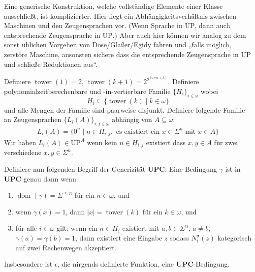 \documentclass[nofonts]{uebung}
\newtheorem{definition}[theorem]{Definition}
\def\UP{\ensuremath{\mathrm{UP}}}
\def\DisjNP{\ensuremath{\mathrm{DisjNP}}}
\DeclareMathOperator{\dom}{dom}
\DeclareMathOperator{\tower}{tower}
\begin{document}
Eine generische Konstruktion, welche vollständige Elemente einer Klasse ausschließt, ist komplizierter. Hier liegt ein Abhängigkeitsverhältnis zwischen Maschinen und den Zeugensprachen vor. (Wenn Sprache in $\UP$, dann auch entsprechende Zeugensprache in $\UP$.)
Aber auch hier können wir analog zu dem sonst üblichen Vorgehen von Dose/Glaßer/Egidy fahren und „falls möglich, zerstöre Maschine, ansonsten sichere dass die entsprechende Zeugensprache in $\UP$ und schließe Reduktionen aus“.



Definiere $\tower(1)=2$, $\tower(k+1)=2^{2^{\tower(k)}}$.
Definiere polynomialzeitberechenbare und -in-\linebreak{}vertierbare Familie $\{H_{i}\}_{i\in\omega}$ wobei
\[ H_{i} \subseteq \{ \tower(k) \mid k\in\omega \} \]
und alle Mengen der Familie sind paarweise disjunkt.
Definiere folgende Familie an Zeugensprachen $\{L_{i}(A) \}_{i,j\in\omega}$ abhängig von $A\subseteq\omega$:
\begin{gather*}
    L_{i}(A) = \{ 0^n \mid n\in H_{i,j}, \text{ es existiert ein $x\in\Sigma^n$ mit $x\in A$} \}
\end{gather*}
Wir haben $L_{i}(A)\in\UP^A$ wenn kein $n\in H_{i,j}$ existiert dass $x, y\in A$ für zwei verschiedene $x,y\in\Sigma^n$.


Definiere nun folgenden Begriff der Generizität $\mathbf{UPC}$: Eine Bedingung $\gamma$ ist in $\mathbf{UPC}$
genau dann wenn 
\begin{enumerate}
    \item $\dom(\gamma)=\Sigma^{\leq n}$ für ein $n\in\omega$, und
    \item wenn $\gamma(x)=1$, dann $|x|= \tower(k)$ für ein $k\in\omega$, und
    \item für alle $i\in\omega$ gilt: wenn ein $n\in H_i$ existiert mit $a,b\in\Sigma^n$, $a\neq b$, $\gamma(a)=\gamma(b)=1$, dann existiert eine Eingabe $z$ sodass $N_i^\sigma(z)$ kategorisch auf zwei Rechenwegen akzeptiert.
\end{enumerate}
Insbesondere ist $\epsilon$, die nirgends definierte Funktion, eine $\mathbf{UPC}$-Bedingung.
\end{document}
